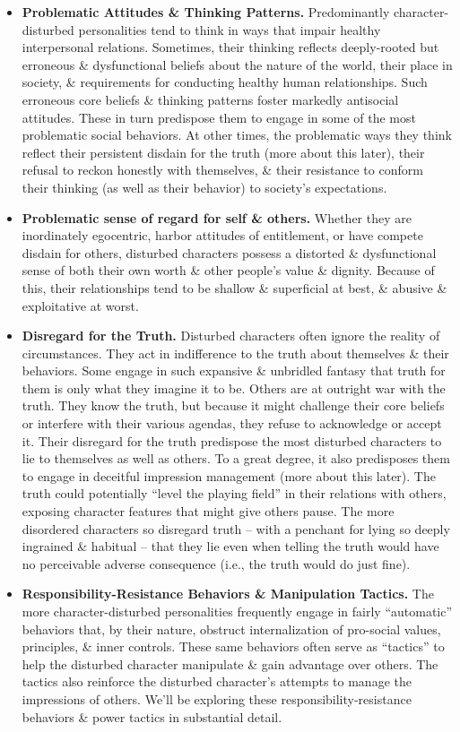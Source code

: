 \documentclass{article}
\numberwithin{equation}{section}
\begin{document}
\begin{itemize}
	\item \textbf{Problematic Attitudes \& Thinking Patterns.} Predominantly character-disturbed personalities tend to think in ways that impair healthy interpersonal relations. Sometimes, their thinking reflects deeply-rooted but erroneous \& dysfunctional beliefs about the nature of the world, their place in society, \& requirements for conducting healthy human relationships. Such erroneous core beliefs \& thinking patterns foster markedly antisocial attitudes. These in turn predispose them to engage in some of the most problematic social behaviors. At other times, the problematic ways they think reflect their persistent disdain for the truth (more about this later), their refusal to reckon honestly with themselves, \& their resistance to conform their thinking (as well as their behavior) to society's expectations.
	\item \textbf{Problematic sense of regard for self \& others.} Whether they are inordinately egocentric, harbor attitudes of entitlement, or have compete disdain for others, disturbed characters possess a distorted \& dysfunctional sense of both their own worth \& other people's value \& dignity. Because of this, their relationships tend to be shallow \& superficial at best, \& abusive \& exploitative at worst.
	\item \textbf{Disregard for the Truth.} Disturbed characters often ignore the reality of circumstances. They act in indifference to the truth about themselves \& their behaviors. Some engage in such expansive \& unbridled fantasy that truth for them is only what they imagine it to be. Others are at outright war with the truth. They know the truth, but because it might challenge their core beliefs or interfere with their various agendas, they refuse to acknowledge or accept it. Their disregard for the truth predispose the most disturbed characters to lie to themselves as well as others. To a great degree, it also predisposes them to engage in deceitful impression management (more about this later). The truth could potentially ``level the playing field'' in their relations with others, exposing character features that might give others pause. The more disordered characters so disregard truth -- with a penchant for lying so deeply ingrained \& habitual -- that they lie even when telling the truth would have no perceivable adverse consequence (i.e., the truth would do just fine).
	\item \textbf{Responsibility-Resistance Behaviors \& Manipulation Tactics.} The more character-disturbed personalities frequently engage in fairly ``automatic'' behaviors that, by their nature, obstruct internalization of pro-social values, principles, \& inner controls. These same behaviors often serve as ``tactics'' to help the disturbed character manipulate \& gain advantage over others. The tactics also reinforce the disturbed character's attempts to manage the impressions of others. We'll be exploring these responsibility-resistance behaviors \& power tactics in substantial detail.

\end{itemize}
\end{document}
